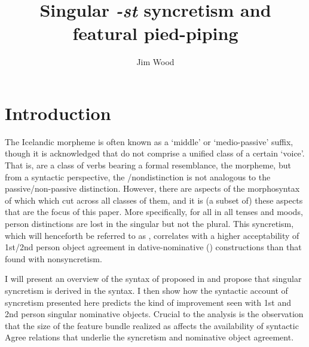 \documentclass[output=paper,colorlinks,citecolor=brown,
]{langscibook}
\author{Jim Wood\affiliation{Yale University}}%
\title{Singular \textit{-st} syncretism and featural pied-piping}
\begin{document}
\maketitle

\section{Introduction}\label{woodsecexs}

 The Icelandic \sti morpheme is often known as a `middle' or `medio-passive' suffix, though it is acknowledged that \stvs do not comprise a unified class of a certain `voice'. That is, \stvs are a class of verbs bearing a formal resemblance, the \sti morpheme, but from a syntactic perspective, the \stin/non\sti distinction is not analogous to the passive/non-passive distinction.  However, there are aspects of the morphosyntax of \stvs which which cut across all classes of them, and it is (a subset of) these aspects that are the focus of this paper. More specifically, for all \stvs in all tenses and moods, person distinctions are lost in the singular but not the plural. This syncretism, which will henceforth be referred to as , correlates with a higher acceptability of 1st/2nd person object agreement in dative-nominative (\datnomn) constructions than that found with non\sti syncretism.  %
 
I will present an overview of the syntax of \sti proposed in  \cite{wood:refl,Wood2015book} and propose that singular \sti syncretism is derived in the syntax. I then show how the syntactic account of \sti syncretism presented here predicts the kind of improvement seen with 1st and 2nd person singular nominative objects. Crucial to the analysis is the observation that the size of the feature bundle realized as \sti affects the availability of syntactic Agree relations that underlie the syncretism and nominative object agreement. 


\end{document}
